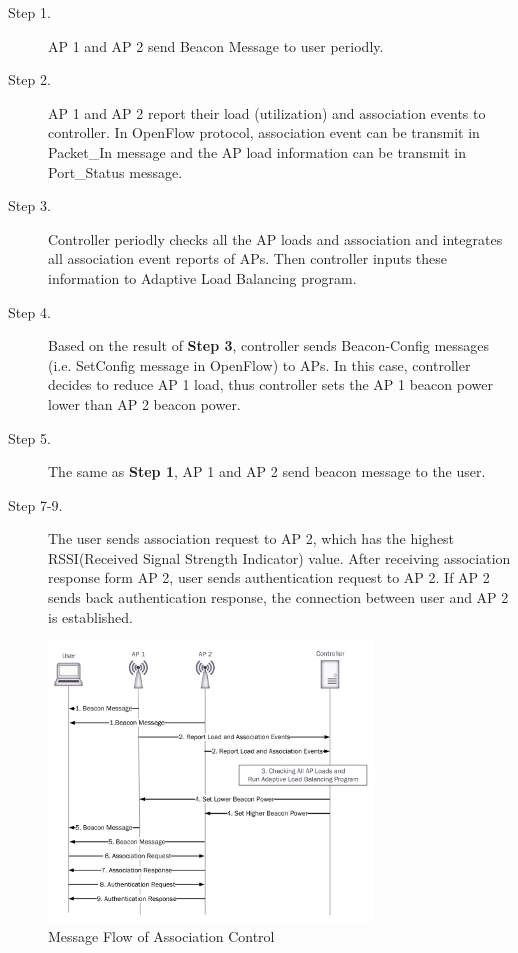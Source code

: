 \begin{description}
  \item [Step 1.] AP 1 and AP 2 send Beacon Message to user periodly.
  \item [Step 2.] AP 1 and AP 2 report their load (utilization) and association events to controller. In OpenFlow protocol, association event can be transmit in Packet\_In message and the AP load information can be transmit in Port\_Status message.
  \item [Step 3.] Controller periodly checks all the AP loads and association and integrates all association event reports of APs. Then controller inputs these information to Adaptive Load Balancing program.
  \item [Step 4.] Based on the result of \textbf{Step 3}, controller sends Beacon-Config messages (i.e. SetConfig message in OpenFlow) to APs. In this case, controller decides to reduce AP 1 load, thus controller sets the AP 1 beacon power lower than AP 2 beacon power.
  \item [Step 5.] The same as \textbf{Step 1}, AP 1 and AP 2 send beacon message to the user.
  \item [Step 7-9.] The user sends association request to AP 2, which has the highest RSSI(Received Signal Strength Indicator) value. After receiving association response form AP 2, user sends authentication request to AP 2. If AP 2 sends back authentication response, the connection between user and AP 2 is established.
\end{description}

\begin{figure}[tbp]
\begin{center}
\includegraphics[width=3.4in]{images/flowchart_Cell_Breathing.pdf}
\end{center}
\caption{Message Flow of Association Control}
\label{fig:flowchart_Cell_Breathing}
\end{figure}



